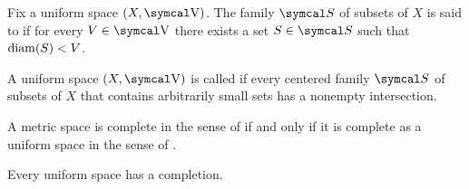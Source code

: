 \begin{definition}\label{def:uniform_space_arbitrarily_small_sets}\cite[446]{Engelking1989}
  Fix a uniform space \( (X, \CV) \). The family \( \Cal{S} \) of subsets of \( X \) is said to  if for every \( V \in \CV \) there exists a set \( S \in \Cal{S} \) such that \( \operatorname{diam}(S) < V \).
\end{definition}

\begin{definition}\label{def:complete_uniform_space}\cite[446]{Engelking1989}
  A uniform space \( (X, \CV) \) is called  if every centered family \( \Cal{S} \) of subsets of \( X \) that contains arbitrarily small sets has a nonempty intersection.
\end{definition}

\begin{proposition}\label{thm:uniform_space_complete_iff_metric_space_complete}
  A metric space is complete in the sense of  if and only if it is complete as a uniform space in the sense of .
\end{proposition}

\begin{theorem}\label{thm:uniform_space_completion_existence}\cite[theorem 8.3.12]{Engelking1989}
  Every uniform space has a completion.
\end{theorem}

